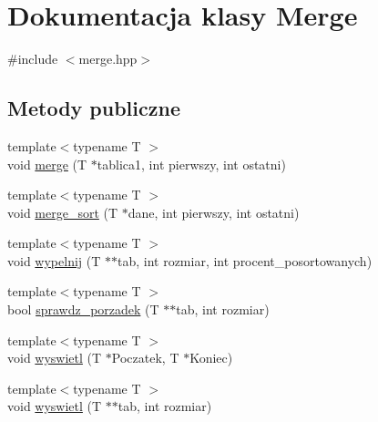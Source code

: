 \hypertarget{class_merge}{\section{\-Dokumentacja klasy \-Merge}
\label{class_merge}
}


{\ttfamily \#include $<$merge.\-hpp$>$}

\subsection*{\-Metody publiczne}
\begin{DoxyCompactItemize}
\item 
{\footnotesize template$<$typename T $>$ }\\void \hyperlink{class_merge_a4988abdfdf2abb6b412934bb4c16c80f}{merge} (\-T $\ast$tablica1, int pierwszy, int ostatni)
\item 
{\footnotesize template$<$typename T $>$ }\\void \hyperlink{class_merge_ae0fee8fd920f1abd9c903793a98a6de2}{merge\-\_\-sort} (\-T $\ast$dane, int pierwszy, int ostatni)
\item 
{\footnotesize template$<$typename T $>$ }\\void \hyperlink{class_merge_ae554c22c5112a15381137978188dd3bb}{wypelnij} (\-T $\ast$$\ast$tab, int rozmiar, int procent\-\_\-posortowanych)
\item 
{\footnotesize template$<$typename T $>$ }\\bool \hyperlink{class_merge_a123099309cb142028d6c2d4a0ea66571}{sprawdz\-\_\-porzadek} (\-T $\ast$$\ast$tab, int rozmiar)
\item 
{\footnotesize template$<$typename T $>$ }\\void \hyperlink{class_merge_ab3245c1b49bd123cf24a8168f718775e}{wyswietl} (\-T $\ast$\-Poczatek, \-T $\ast$\-Koniec)
\item 
{\footnotesize template$<$typename T $>$ }\\void \hyperlink{class_merge_a8cbad74164adfdfd8fc922b174885cd1}{wyswietl} (\-T $\ast$$\ast$tab, int rozmiar)
\end{DoxyCompactItemize}


